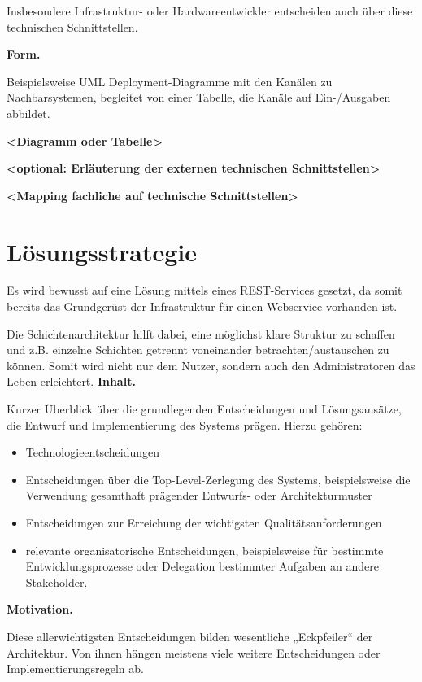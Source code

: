 \documentclass[]{article}
\begin{document}
Insbesondere Infrastruktur- oder Hardwareentwickler entscheiden auch
über diese technischen Schnittstellen.

\textbf{Form.}

Beispielsweise UML Deployment-Diagramme mit den Kanälen zu
Nachbarsystemen, begleitet von einer Tabelle, die Kanäle auf
Ein-/Ausgaben abbildet.

\textbf{\textless{}Diagramm oder Tabelle\textgreater{}}

\textbf{\textless{}optional: Erläuterung der externen technischen
Schnittstellen\textgreater{}}

\textbf{\textless{}Mapping fachliche auf technische
Schnittstellen\textgreater{}}

\section{Lösungsstrategie}\label{section-solution-strategy}
Es wird bewusst auf eine Lösung mittels eines REST-Services gesetzt, da somit bereits das Grundgerüst der Infrastruktur für einen Webservice vorhanden ist.

Die Schichtenarchitektur hilft dabei, eine möglichst klare Struktur zu schaffen und z.B. einzelne Schichten getrennt voneinander betrachten/austauschen zu können. Somit wird nicht nur dem Nutzer, sondern auch den Administratoren das Leben erleichtert.
\textbf{Inhalt.}

Kurzer Überblick über die grundlegenden Entscheidungen und
Lösungsansätze, die Entwurf und Implementierung des Systems prägen.
Hierzu gehören:

\begin{itemize}
\item
  Technologieentscheidungen
\item
  Entscheidungen über die Top-Level-Zerlegung des Systems,
  beispielsweise die Verwendung gesamthaft prägender Entwurfs- oder
  Architekturmuster
\item
  Entscheidungen zur Erreichung der wichtigsten Qualitätsanforderungen
\item
  relevante organisatorische Entscheidungen, beispielsweise für
  bestimmte Entwicklungsprozesse oder Delegation bestimmter Aufgaben an
  andere Stakeholder.
\end{itemize}

\textbf{Motivation.}

Diese allerwichtigsten Entscheidungen bilden wesentliche „Eckpfeiler``
der Architektur. Von ihnen hängen meistens viele weitere Entscheidungen
oder Implementierungsregeln ab.
\end{document}
